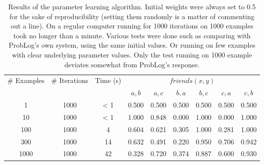 \begin{table}[h]
\centering
\begin{tabular}{ccc|cccccc}
\# Examples & \# Iterations & Time (s) & \multicolumn{6}{c}{$friends(x,y)$}\\
& & & $a,b$ & $a,c$ & $b,a$ & $b,c$ & $c,a$ & $c,b$\\\hline
1 & 1000 & < 1 & 0.500 & 0.500 & 0.500 & 0.500 & 0.500 & 0.500 \\
10 & 1000 & < 1 & 1.000 & 0.848 & 0.000 & 1.000 & 0.000 & 1.000 \\
100 & 1000 & 4 & 0.604 & 0.621 & 0.305 & 1.000 & 0.281 & 1.000 \\
300 & 1000 & 14 & 0.632 & 0.491 & 0.220 & 0.950 & 0.706 & 0.942 \\
1000 & 1000 & 42 & 0.328 & 0.720 & 0.374 & 0.887 & 0.600 & 0.930 \\
\end{tabular}
\caption{Results of the parameter learning algorithm. Initial weights were always set to 0.5 for the sake of reproducibility (setting them randomly is a matter of commenting out a line). On a regular computer running for 1000 iterations on 1000 examples took no longer than a minute. Various tests were done such as comparing with ProbLog's own system, using the same initial values. Or running on few examples with clear underlying parameter values. Only the test running on 1000 example deviates somewhat from ProbLog's response.}
\label{plres}
\end{table}
